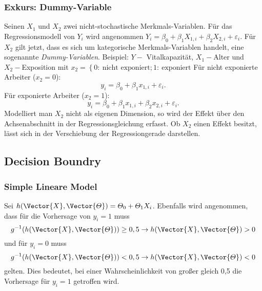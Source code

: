 \subsubsection{Exkurs: Dummy-Variable}
Seinen $X_1$ und $X_2$ zwei nicht-stochastische Merkmals-Variablen. Für das Regressionsmodell von $Y_i$ wird angenommen $Y_i = \beta_0 + \beta_1X_{1,i} + \beta_2X_{2,i} + \varepsilon_i$. Für $X_2$ gilt jetzt, dass es sich um kategorische Merkmals-Variablen handelt, eine sogenannte \textit{Dummy-Variablen}.
Beispiel: $Y-$ Vitalkapazität, $X_1-$Alter und $X_2-$Exposition mit $x_2 = \left\lbrace 0:\:\text{nicht exponiert}; 1:\:\text{exponiert}\right.$ Für nicht exponierte Arbeiter ($x_2=0$): $$y_i = \beta_0 + \beta_1x_{1,i} + \varepsilon_i.$$
Für exponierte Arbeiter ($x_2=1$): $$y_i = \beta_0 + \beta_1x_{1,i} + \beta_2x_{2,i}+\varepsilon_i.$$
Modelliert man $X_2$ nicht als eigenen Dimension, so wird der Effekt über den Achsenabschnitt in der Regressionsgleichung erfasst. Ob $X_2$ einen Effekt besitzt, lässt sich in der Verschiebung der Regressiongerade darstellen.

\subsection{Decision Boundry}
\subsubsection{Simple Lineare Model}
Sei $h(\Vector{X}, \Vector{\varTheta}) = \varTheta_0 + \varTheta_1X_i$. Ebenfalls wird angenommen, dass für die Vorhersage von $y_i=1$ muss $$g^{-1}(h(\Vector{X}, \Vector{\varTheta}))\geq 0,5 \rightarrow h(\Vector{X}, \Vector{\varTheta}) > 0$$ und für $y_i=0$ muss $$g^{-1}(h(\Vector{X}, \Vector{\varTheta}))< 0,5 \rightarrow h(\Vector{X}, \Vector{\varTheta})<0$$ gelten. Dies bedeutet, bei einer Wahrscheinlichkeit von großer gleich 0,5 die Vorhersage für $y_i=1$ getroffen wird.

